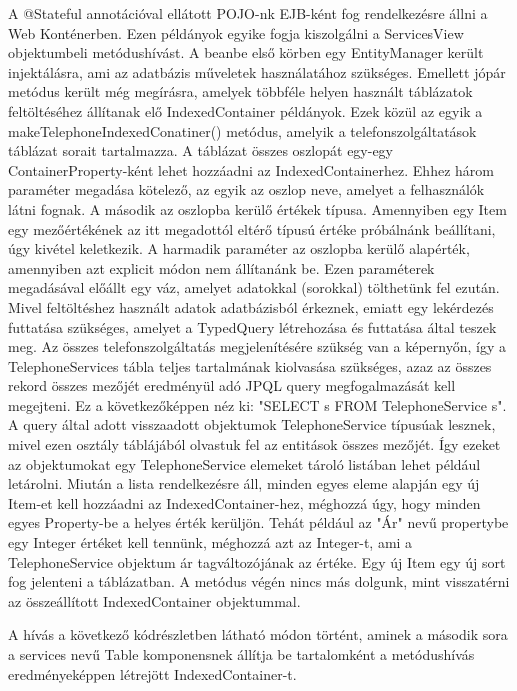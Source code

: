 \documentclass[centeredchapter]{thesis-ekf}
\theoremstyle{definition}
\theoremstyle{remark}
\begin{document}
A @Stateful annotációval ellátott POJO-nk EJB-ként fog rendelkezésre állni a Web Konténerben. Ezen példányok egyike fogja kiszolgálni a ServicesView objektumbeli metódushívást. A beanbe első körben egy EntityManager került injektálásra, ami az adatbázis műveletek használatához szükséges. Emellett jópár metódus került még megírásra, amelyek többféle helyen használt táblázatok feltöltéséhez állítanak elő IndexedContainer példányok. Ezek közül az egyik a makeTelephoneIndexedConatiner() metódus, amelyik a telefonszolgáltatások táblázat sorait tartalmazza. A táblázat összes oszlopát egy-egy ContainerProperty-ként lehet hozzáadni az IndexedContainerhez. Ehhez három paraméter megadása kötelező, az egyik az oszlop neve, amelyet a felhasználók látni fognak. A második az oszlopba kerülő értékek típusa. Amennyiben egy Item egy mezőértékének az itt megadottól eltérő típusú értéke próbálnánk beállítani, úgy kivétel keletkezik. A harmadik paraméter az oszlopba kerülő alapérték, amennyiben azt explicit módon nem állítanánk be. Ezen paraméterek megadásával előállt egy váz, amelyet adatokkal (sorokkal) tölthetünk fel ezután.
Mivel feltöltéshez használt adatok adatbázisból érkeznek, emiatt egy lekérdezés futtatása szükséges, amelyet a TypedQuery létrehozása és futtatása által teszek meg. Az összes telefonszolgáltatás megjelenítésére szükség van a képernyőn, így a TelephoneServices tábla teljes tartalmának kiolvasása szükséges, azaz az összes rekord összes mezőjét eredményül adó JPQL query megfogalmazását kell megejteni. Ez a következőképpen néz ki: "SELECT s FROM TelephoneService s". A query által adott visszaadott objektumok TelephoneService típusúak lesznek, mivel ezen osztály táblájából olvastuk fel az entitások összes mezőjét. Így ezeket az objektumokat egy TelephoneService elemeket tároló listában lehet például letárolni. Miután a lista rendelkezésre áll, minden egyes eleme alapján egy új Item-et kell hozzáadni az IndexedContainer-hez, méghozzá úgy, hogy minden egyes Property-be a helyes érték kerüljön. Tehát például az "Ár" nevű propertybe egy Integer értéket kell tennünk, méghozzá azt az Integer-t, ami a TelephoneService objektum ár tagváltozójának az értéke. Egy új Item egy új sort fog jelenteni a táblázatban.
A metódus végén nincs más dolgunk, mint visszatérni az összeállított IndexedContainer objektummal.

A hívás a következő kódrészletben látható módon történt, aminek a második sora a services nevű Table komponensnek állítja be tartalomként a metódushívás eredményeképpen létrejött IndexedContainer-t.
\end{document}
